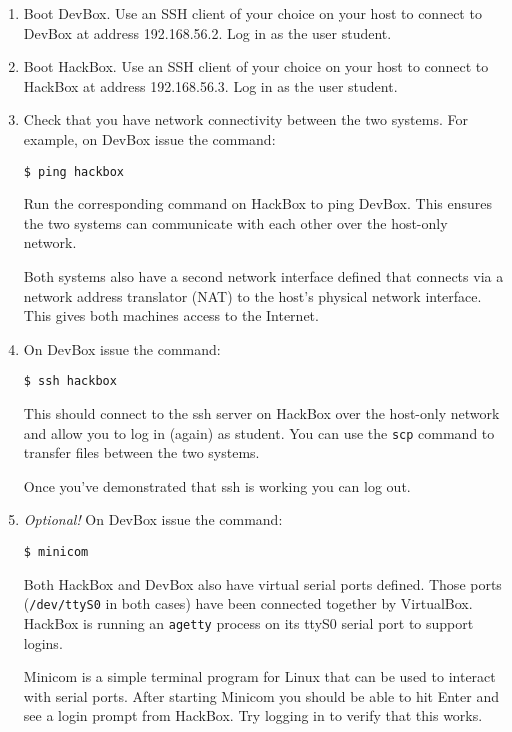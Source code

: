 \documentclass{article}
\begin{document}
\begin{enumerate}

\item Boot DevBox. Use an SSH client of your choice on your host to connect to DevBox at address
192.168.56.2. Log in as the user student.

\item Boot HackBox. Use an SSH client of your choice on your host to connect to HackBox at
address 192.168.56.3. Log in as the user student.

\item Check that you have network connectivity between the two systems. For example, on DevBox
  issue the command:
\begin{Verbatim}
$ ping hackbox
\end{Verbatim}
  Run the corresponding command on HackBox to ping DevBox. This ensures the two systems can
  communicate with each other over the host-only network.

  Both systems also have a second network interface defined that connects via a network address
  translator (NAT) to the host's physical network interface. This gives both machines access to
  the Internet.

\item On DevBox issue the command:
\begin{Verbatim}
$ ssh hackbox
\end{Verbatim}
  This should connect to the ssh server on HackBox over the host-only network and allow you to
  log in (again) as student. You can use the \texttt{scp} command to transfer files between the
  two systems.

  Once you've demonstrated that ssh is working you can log out.

\item \textit{Optional!} On DevBox issue the command:
\begin{Verbatim}
$ minicom
\end{Verbatim}
  Both HackBox and DevBox also have virtual serial ports defined. Those ports
  (\texttt{/dev/ttyS0} in both cases) have been connected together by VirtualBox. HackBox is
  running an \texttt{agetty} process on its ttyS0 serial port to support logins.

  Minicom is a simple terminal program for Linux that can be used to interact with serial ports.
  After starting Minicom you should be able to hit Enter and see a login prompt from HackBox.
  Try logging in to verify that this works.


\end{enumerate}
\end{document}
